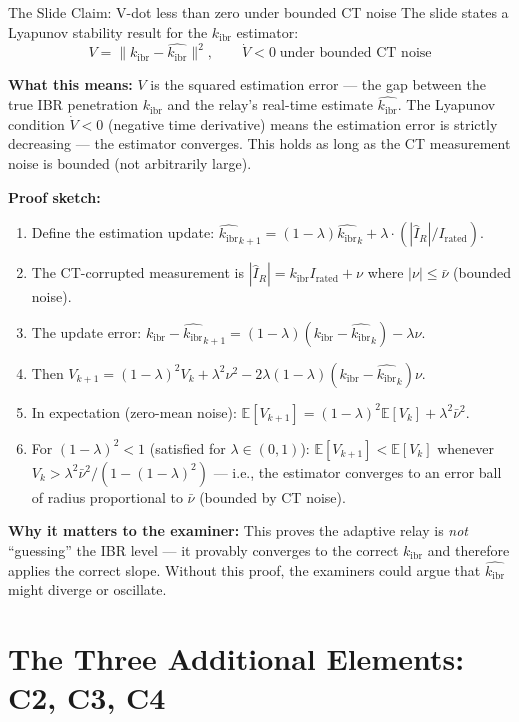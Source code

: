 \documentclass[12pt,a4paper]{article}
\newcommand{\kibr}{k_\mathrm{ibr}}
\begin{document}
\begin{archbox}{The Slide Claim: V-dot less than zero under bounded CT noise}
The slide states a Lyapunov stability result for the $\kibr$ estimator:
\[
  V = \|\kibr - \hat{\kibr}\|^2, \qquad \dot{V} < 0 \;\text{under bounded CT noise}
\]

\textbf{What this means:} $V$ is the squared estimation error --- the gap between the true IBR penetration $\kibr$ and the relay's real-time estimate $\hat{\kibr}$. The Lyapunov condition $\dot{V} < 0$ (negative time derivative) means the estimation error is strictly decreasing --- the estimator converges. This holds as long as the CT measurement noise is bounded (not arbitrarily large).

\textbf{Proof sketch:}
\begin{enumerate}[nosep]
  \item Define the estimation update: $\hat{\kibr}_{k+1} = (1-\lambda)\hat{\kibr}_k + \lambda \cdot (|\hat{I}_R|/I_\mathrm{rated})$.
  \item The CT-corrupted measurement is $|\hat{I}_R| = \kibr I_\mathrm{rated} + \nu$ where $|\nu| \leq \bar{\nu}$ (bounded noise).
  \item The update error: $\kibr - \hat{\kibr}_{k+1} = (1-\lambda)(\kibr - \hat{\kibr}_k) - \lambda\nu$.
  \item Then $V_{k+1} = (1-\lambda)^2 V_k + \lambda^2\nu^2 - 2\lambda(1-\lambda)(\kibr-\hat{\kibr}_k)\nu$.
  \item In expectation (zero-mean noise): $\mathbb{E}[V_{k+1}] = (1-\lambda)^2 \mathbb{E}[V_k] + \lambda^2\bar{\nu}^2$.
  \item For $(1-\lambda)^2 < 1$ (satisfied for $\lambda \in (0,1)$): $\mathbb{E}[V_{k+1}] < \mathbb{E}[V_k]$ whenever $V_k > \lambda^2\bar{\nu}^2/(1-(1-\lambda)^2)$ --- i.e., the estimator converges to an error ball of radius proportional to $\bar{\nu}$ (bounded by CT noise).
\end{enumerate}

\textbf{Why it matters to the examiner:} This proves the adaptive relay is \emph{not} ``guessing'' the IBR level --- it provably converges to the correct $\kibr$ and therefore applies the correct slope. Without this proof, the examiners could argue that $\hat{\kibr}$ might diverge or oscillate.
\end{archbox}

\section{The Three Additional Elements: C2, C3, C4}
\end{document}
